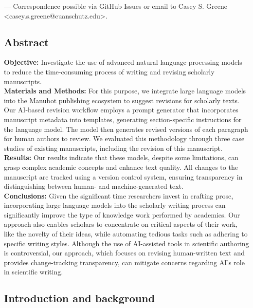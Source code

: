 \documentclass[
]{article}
\begin{document}
\leavevmode{}%
\Letter --- Correspondence possible via GitHub Issues
or email to
Casey S. Greene \textless casey.s.greene@cuanschutz.edu\textgreater.

\hypertarget{abstract}{%
\subsection{Abstract}\label{abstract}}

\textbf{Objective:} Investigate the use of advanced natural language processing models to reduce the time-consuming process of writing and revising scholarly manuscripts.\\
\textbf{Materials and Methods:} For this purpose, we integrate large language models into the Manubot publishing ecosystem to suggest revisions for scholarly texts.
Our AI-based revision workflow employs a prompt generator that incorporates manuscript metadata into templates, generating section-specific instructions for the language model.
The model then generates revised versions of each paragraph for human authors to review.
We evaluated this methodology through three case studies of existing manuscripts, including the revision of this manuscript.\\
\textbf{Results:} Our results indicate that these models, despite some limitations, can grasp complex academic concepts and enhance text quality.
All changes to the manuscript are tracked using a version control system, ensuring transparency in distinguishing between human- and machine-generated text.\\
\textbf{Conclusions:} Given the significant time researchers invest in crafting prose, incorporating large language models into the scholarly writing process can significantly improve the type of knowledge work performed by academics.
Our approach also enables scholars to concentrate on critical aspects of their work, like the novelty of their ideas, while automating tedious tasks such as adhering to specific writing styles.
Although the use of AI-assisted tools in scientific authoring is controversial, our approach, which focuses on revising human-written text and provides change-tracking transparency, can mitigate concerns regarding AI's role in scientific writing.

\hypertarget{introduction}{%
\subsection{Introduction and background}\label{introduction}}
\end{document}

